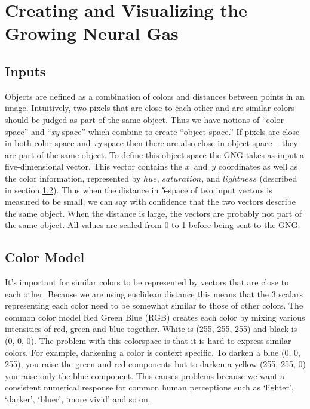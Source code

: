 \documentclass{article}
\renewcommand{\|}{\origbar} %
\newcommand{\xyspace}{{\em xy} space}
\begin{document}
\section{Creating and Visualizing the Growing Neural Gas}
\label{sec:creatingGNG}

\subsection{Inputs}

Objects are defined as a combination of colors and distances between points in an image. Intuitively, two pixels that are close to each other and are similar colors should be judged as part of the same object. Thus we have notions of ``color space'' and ``\xyspace'' which combine to create ``object space.'' If pixels are close in both color space and \xyspace{} then there are also close in object space -- they are part of the same object. To define this object space the GNG takes as input a five-dimensional vector. This vector contains the $x$~and~$y$ coordinates as well as the color information, represented by $hue$, $saturation$, and $lightness$ (described in section \ref{sec:colorModel}). Thus when the distance in 5-space of two input vectors is measured to be small, we can say with confidence that the two vectors describe the same object. When the distance is large, the vectors are probably not part of the same object. All values are scaled from 0 to 1 before being sent to the GNG.

\subsection{Color Model}
\label{sec:colorModel}

It's important for similar colors to be represented by vectors that are close to each other. Because we are using euclidean distance this means that the 3 scalars representing each color need to be somewhat similar to those of other colors. The common color model Red Green Blue (RGB) creates each color by mixing various intensities of red, green and blue together. White is (255, 255, 255) and black is (0, 0, 0). The problem with this colorspace is that it is hard to express similar colors. For example, darkening a color is context specific. To darken a blue (0, 0, 255), you raise the green and red components but to darken a yellow (255, 255, 0) you raise only the blue component. This causes problems because we want a consistent numerical response for common human perceptions such as `lighter', `darker', `bluer', `more vivid' and so on.
\end{document}
